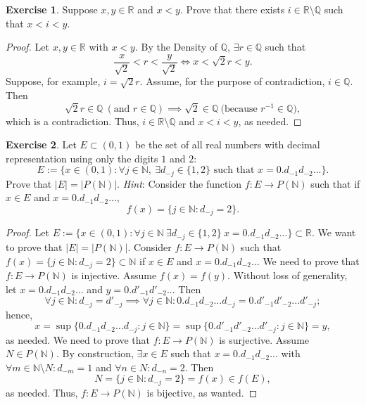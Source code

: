 \documentclass[12pt]{article}
\theoremstyle{definition}
\newtheorem{exercise}{Exercise}
\begin{document}
\thispagestyle{firstpage}

\begin{exercise}
    Suppose $x,y \in \mathbb{R}$ and $x < y$. Prove that there exists $i \in \mathbb{R}\setminus\mathbb{Q}$ such that $x < i < y$.
\end{exercise}

\begin{proof}
    Let $x,y \in \mathbb{R}$ with $x < y$. By the Density of $\mathbb{Q}$, $\exists r \in \mathbb{Q}$ such that 
    \[
        \frac{x}{\sqrt{2}} < r < \frac{y}{\sqrt{2}} \iff x < \sqrt{2}r < y.
    \]
    Suppose, for example, $i = \sqrt{2}r$. Assume, for the purpose of contradiction, $i \in \mathbb{Q}$. Then
    \[
        \sqrt{2}r \in \mathbb{Q} \ (\text{and $r \in \mathbb{Q}$}) \implies \sqrt{2} \in \mathbb{Q} \ (\text{because $r^{-1} \in \mathbb{Q}$)},
    \]
    which is a contradiction. Thus, $i \in \mathbb{R}\setminus\mathbb{Q}$ and $x < i < y$, as needed. 
\end{proof}

\begin{exercise}
    Let $E \subset (0, 1)$ be the set of all real numbers with decimal representation using only the digits $1$ and $2$:
    \[
        E := \{x \in (0,1) : \forall j \in \mathbb{N}, \ \exists d_{-j} \in \{1, 2\} \text{ such that } x = 0.d_{-1}d_{-2}...\}.
    \]
    Prove that $\vert E \vert = \vert P(\mathbb{N}) \vert$. \textit{Hint}: Consider the function $f : E \to P(\mathbb{N})$ such that if $x \in E$ and $x = 0.d_{-1}d_{-2}...$, 
    \[
        f(x) = \{j \in \mathbb{N} : d_{-j} = 2\}.
    \]
\end{exercise}

\begin{proof}
    Let $E := \{x \in (0,1) : \forall j \in \mathbb{N} \ \exists d_{-j} \in \{1,2\} \ x = 0.d_{-1}d_{-2}...\} \subset \mathbb{R}$. We want to prove that $\vert E \vert = \vert P(\mathbb{N}) \vert$. Consider $f : E \to P(\mathbb{N})$ such that $f(x) = \{j \in \mathbb{N} : d_{-j} = 2\} \subset \mathbb{N}$ if $x \in E$ and $x = 0.d_{-1}d_{-2}..$. We need to prove that $f: E \to P(\mathbb{N})$ is injective. Assume $f(x) = f(y)$. Without loss of generality, let $x = 0.d_{-1}d_{-2}...$ and $y = 0.d'_{-1}d'_{-2}..$. Then
    \[
        \forall j \in \mathbb{N} : d_{-j} = d'_{-j} \implies \forall j \in \mathbb{N} : 0.d_{-1}d_{-2}...d_{-j} = 0.d'_{-1}d'_{-2}...d'_{-j};
    \]
    hence,
    \[
        x = \sup\{0.d_{-1}d_{-2}...d_{-j} : j \in \mathbb{N}\} = \sup\{0.d'_{-1}d'_{-2}...d'_{-j} : j \in \mathbb{N}\} = y,
    \]
    as needed. We need to prove that $f : E \to P(\mathbb{N})$ is surjective. Assume $N \in P(\mathbb{N})$. By construction, $\exists x \in E$ such that $x = 0.d_{-1}d_{-2}...$ with $\forall m \in \mathbb{N} \setminus N : d_{-m} = 1$ and $\forall n \in N : d_{-n} = 2$. Then
    \[
        N = \{j \in \mathbb{N} : d_{-j} = 2\} = f(x) \in f(E),
    \]
    as needed. Thus, $f : E \to P(\mathbb{N})$ is bijective, as wanted.
\end{proof}
\end{document}
